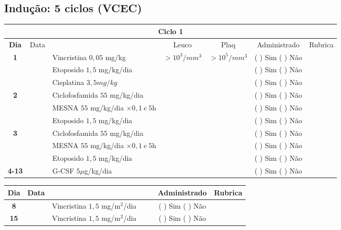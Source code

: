 \documentclass[11pt,a4paper,oldfontcommands]{memoir}
\begin{document}
\hfill \\

\hfill  {}\\

\subsection{Indução: 5 ciclos (VCEC)}
\renewcommand{\arraystretch}{1.5}
\begin{center}
\begin{longtable}{p{1cm}c|p{4.8cm}|p{1.5cm}p{1.5cm}|c|c}
	\hline
	\multicolumn{7}{c}{Ciclo 1} \\
	\hline
	\multicolumn{1}{c|}{\multirow{1}{*}{\textbf{Dia}}}&{Data}&{}&\multicolumn{1}{c|}{Leuco}&\multicolumn{1}{c|}{Plaq}&{Administrado}&{Rubrica} \\
    \hline
    \multicolumn{1}{c|}{\multirow{3}{*}{\textbf{1}}}&&{Vincristina \(0,05\) mg/kg}&\multicolumn{1}{c|}{\(>10^3/mm^3\)}&\multicolumn{1}{c|}{\(>10^5/mm^3\)}&{(  ) Sim (  ) Não}&\\
    \cline{4-5}
    \multicolumn{1}{c|}{}&&{Etoposido \(1,5\) mg/kg/dia}&\multicolumn{1}{c|}{}&&{(  ) Sim (  ) Não}&\\
    \cline{4-5}
    \multicolumn{1}{c|}{}&\multirow{1}{*}{}&{Cisplatina \(3,5mg/kg\)}&&&{(  ) Sim (  ) Não}&\\
    \hline
    \multicolumn{1}{c|}{\multirow{3}{*}{\textbf{2}}}&&{Ciclofosfamida \(55\) mg/kg/dia}&{}&&{(  ) Sim (  ) Não}&\\
    \multicolumn{1}{c|}{}&&{MESNA \(55\) mg/kg/dia \(\times 0,1 \:e\: 5\)h}&&&{(  ) Sim (  ) Não}&\\
    \multicolumn{1}{c|}{}&&{Etoposido \(1,5\) mg/kg/dia}&&&{(  ) Sim (  ) Não}&\\
    \hline
    \multicolumn{1}{c|}{\multirow{3}{*}{\textbf{3}}}&&{Ciclofosfamida \(55\) mg/kg/dia}&{}&&{(  ) Sim (  ) Não}&\\
    \multicolumn{1}{c|}{}&&{MESNA \(55\) mg/kg/dia \(\times 0,1 \:e\: 5\)h}&&&{(  ) Sim (  ) Não}&\\
    \multicolumn{1}{c|}{}&\multirow{1}{*}{}&{Etoposido \(1,5\) mg/kg/dia}&{}&&{(  ) Sim (  ) Não}&\\
    \hline
    \multicolumn{1}{c|}{\textbf{4-13}}&&{G-CSF \(5 \mu\)g/kg/dia }&&&{(  ) Sim (  ) Não}&\\
    \hline
\end{longtable}
\begin{longtable}{p{1cm}c|p{4cm}|p{2cm}p{2cm}|c|c}
	\hline
	\multicolumn{1}{c|}{\multirow{1}{*}{\textbf{Dia}}}&{Data}&{}&{}&&{Administrado}&{Rubrica} \\
    \hline
    \multicolumn{1}{c|}{\textbf{8}}&&{Vincristina \(1,5\) mg/m\(^2\)/dia}&\multicolumn{1}{c}{}&&{(  ) Sim (  ) Não}&\\
    \hline
    \multicolumn{1}{c|}{\textbf{15}}&&{Vincristina \(1,5\) mg/m\(^2\)/dia}&\multicolumn{1}{c}{}&&{(  ) Sim (  ) Não}&\\
    \hline
\end{longtable}


\end{center}
\end{document}
